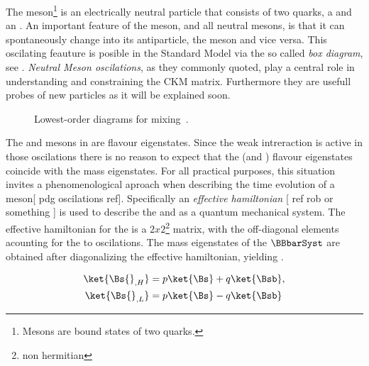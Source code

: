 

The \Bs meson\footnote{Mesons are bound states of two quarks.} is an electrically neutral
particle that consists of two quarks, a \bquarkbar and an \squark. An important feature of
the \Bs meson, and all neutral mesons, is that it can spontaneously change into its antiparticle,
the \Bsb meson and vice versa. This oscilating feauture is posible in the Standard Model via the
so called {\it box diagram}, see . {\it Neutral Meson oscilations}, as they commonly
quoted, play a central role in understanding and constraining the CKM matrix. Furthermore they are
usefull probes of new particles as it will be explained soon.

\begin{figure}[h]
  \centering
  \begin{subfigure}{0.5\textwidth}
    \centering
    {\sffamily }
    \caption{}
    \label{bs_box_1}
  \end{subfigure}%
  \begin{subfigure}{0.5\textwidth}
    \centering
    {\sffamily }
    \caption{}
    \label{bs_box_2}
  \end{subfigure}
  \caption{Lowest-order diagrams for mixing~\cite{LHCb-PAPER-2013-002}.}
  \label{bs_box}
\end{figure}

The \Bs and \Bsb mesons in  are flavour eigenstates. Since the weak intreraction
is active in those oscilations there is no reason to expect that the \Bs (and \Bsb) flavour eigenstates
coincide with the mass eigenstates. For all practical purposes, this situation invites a phenomenological
aproach when describing the time evolution of a \Bs meson[{\color{red} pdg oscilations ref}]. Specifically
an {\it effective hamiltonian} [{\color{red} ref rob or something} ] is used to describe the \Bs and \Bsb
as a quantum mechanical system. The effective hamiltonian for the \BBbarSyst is a $2x2$\footnote{non hermitian}
matrix, with the off-diagonal elements acounting for the \Bs to \Bsb oscilations.
The mass eigenstates of the $\BBbarSyst$ are obtained after diagonalizing the effective hamiltonian, yielding .

\begin{align}
\ket{\Bs{}_{,H}} &= p \ket{\Bs} + q \ket{\Bsb}, \nonumber \\
\ket{\Bs{}_{,L}} &= p \ket{\Bs} - q \ket{\Bsb}
\label{bs_mass_eigen}
\end{align}

